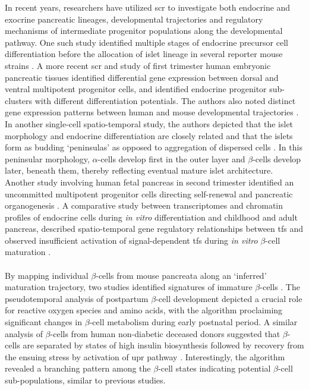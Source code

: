 In recent years, researchers have utilized \gls{scr} to investigate both endocrine and exocrine pancreatic lineages, developmental trajectories and regulatory mechanisms of intermediate progenitor populations along the developmental pathway. One such study identified multiple stages of endocrine precursor cell differentiation before the allocation of islet lineage in several reporter mouse strains \textbf{\cite{yu_defining_2019}}. A more recent \gls{scr} and  study of first trimester human embryonic pancreatic tissues identified differential gene expression between dorsal and ventral multipotent progenitor cells, and identified endocrine progenitor sub-clusters with different differentiation potentials. The authors also noted distinct gene expression patterns between human and mouse developmental trajectories \textbf{\cite{ma_deciphering_2023}}. In another single-cell spatio-temporal study, the authors depicted that the islet morphology and endocrine differentiation are closely related and that the islets form as budding `peninsulas' as opposed to aggregation of dispersed cells \textbf{\cite{sharon_peninsular_2019}}. In this peninsular morphology, $\alpha$-cells develop first in the outer layer and $\beta$-cells develop later, beneath them, thereby reflecting eventual mature islet architecture. Another study involving human fetal pancreas in second trimester identified an uncommitted multipotent progenitor cells directing self-renewal and pancreatic organogenesis \textbf{\cite{villani_sox9ptf1a_2019}}. A comparative study between transcriptomes and chromatin profiles of endocrine cells during \textit{in vitro} differentiation and childhood and adult pancreas, described spatio-temporal gene regulatory relationships between \glspl{tf} and observed insufficient activation of signal-dependent \glspl{tf} during \textit{in vitro} $\beta$-cell maturation \textbf{\cite{zhu_understanding_2023}}.\\\\ 
By mapping individual $\beta$-cells from mouse pancreata along an `inferred' maturation trajectory, two studies identified signatures of immature $\beta$-cells \textbf{\cite{qiu_deciphering_2017,zeng_pseudotemporal_2017}}. The pseudotemporal analysis of postpartum $\beta$-cell development depicted a crucial role for reactive oxygen species and amino acids, with the algorithm proclaiming significant changes in $\beta$-cell metabolism during early postnatal period. A similar analysis of $\beta$-cells from human non-diabetic deceased donors suggested that $\beta$-cells are separated by states of high insulin biosynthesis followed by recovery from the ensuing  stress by activation of \gls{upr} pathway \textbf{\cite{xin_pseudotime_2018}}.  Interestingly, the algorithm revealed a branching pattern among the $\beta$-cell states indicating potential $\beta$-cell sub-populations, similar to previous studies.\\\\
